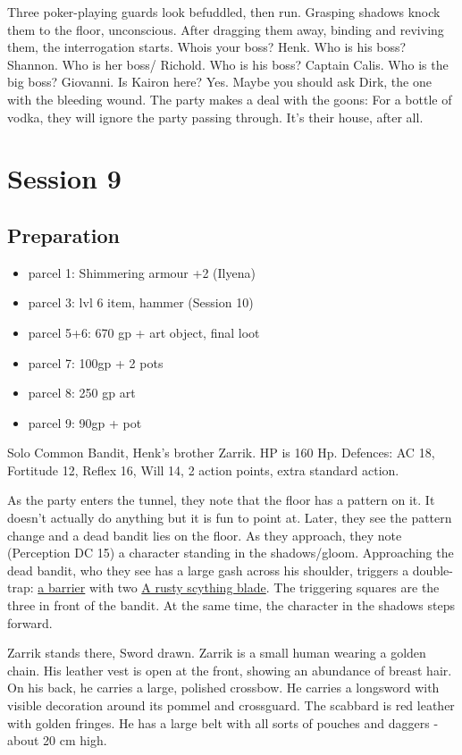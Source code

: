 Three poker-playing guards look befuddled, then run. Grasping shadows knock them to the floor, unconscious. After dragging them away, binding and reviving them, the interrogation starts. Whois your boss? Henk. Who is his boss? Shannon. Who is her boss/ Richold. Who is his boss? Captain Calis. Who is the big boss? Giovanni. Is Kairon here? Yes. Maybe you should ask Dirk, the one with the bleeding wound. The party makes a deal with the goons: For a bottle of vodka, they will ignore the party passing through. It's their house, after all.

\chapter{Session 9}
\section{Preparation}
\begin{itemize}
\item parcel 1: Shimmering armour +2 (Ilyena)
\item parcel 3: lvl 6 item, hammer (Session 10)
\item parcel 5+6: 670 gp + art object, final loot
\item parcel 7: 100gp + 2 pots
\item parcel 8: 250 gp art
\item parcel 9: 90gp + pot
\end{itemize}

Solo Common Bandit, Henk's brother Zarrik. HP is 160 Hp. Defences: AC 18, Fortitude 12, Reflex 16, Will 14, 2 action points, extra standard action.

As the party enters the tunnel, they note that the floor has a pattern on it. It doesn't actually do anything but it is fun to point at. Later, they see the pattern change and a dead bandit lies on the floor. As they approach, they note (Perception DC 15) a character standing in the shadows/gloom. Approaching the dead bandit, who they see has a large gash across his shoulder, triggers a double-trap: \href{https://www.dandwiki.com/wiki/One-way_barrier_(4e_Trap)}{a barrier} with two \href{https://www.dandwiki.com/wiki/Scything_Blade_Trap_(4e_Trap)}{A rusty scything blade}. The triggering squares are the three in front of the bandit. At the same time, the character in the shadows steps forward.

Zarrik stands there, Sword drawn. Zarrik is a small human wearing a golden chain. His leather vest is open at the front, showing an abundance of breast hair. On his back, he carries a large, polished crossbow. He carries a longsword with visible decoration around its pommel and crossguard. The scabbard is red leather with golden fringes. He has a large belt with all sorts of pouches and daggers - about 20 cm high. 

